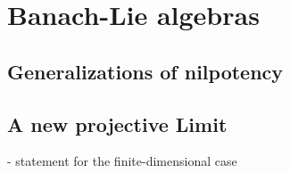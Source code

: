 \section{Banach-Lie algebras}
\label{sec:chap6_TheEProperty}

\subsection{Generalizations of nilpotency}

\subsection{A new projective Limit}
	 - statement for the finite-dimensional case